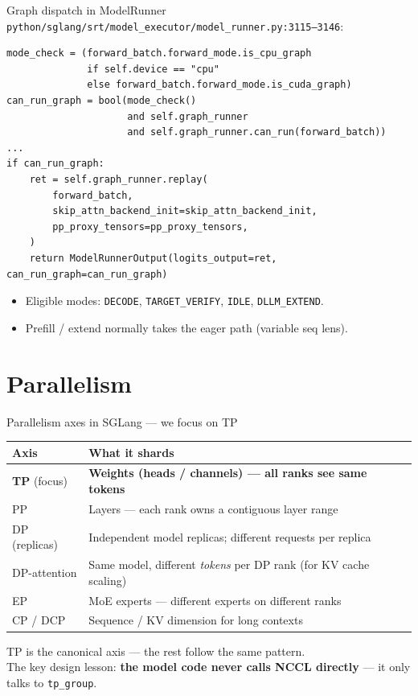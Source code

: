\documentclass[aspectratio=169,10pt]{beamer}
\begin{document}
\begin{frame}[fragile]{Graph dispatch in ModelRunner}
  \footnotesize
  \texttt{python/sglang/srt/model\_executor/model\_runner.py:3115--3146}:
\begin{lstlisting}
mode_check = (forward_batch.forward_mode.is_cpu_graph
              if self.device == "cpu"
              else forward_batch.forward_mode.is_cuda_graph)
can_run_graph = bool(mode_check()
                     and self.graph_runner
                     and self.graph_runner.can_run(forward_batch))
...
if can_run_graph:
    ret = self.graph_runner.replay(
        forward_batch,
        skip_attn_backend_init=skip_attn_backend_init,
        pp_proxy_tensors=pp_proxy_tensors,
    )
    return ModelRunnerOutput(logits_output=ret, can_run_graph=can_run_graph)
\end{lstlisting}
  \begin{itemize}\scriptsize
    \item Eligible modes: \texttt{DECODE}, \texttt{TARGET\_VERIFY}, \texttt{IDLE}, \texttt{DLLM\_EXTEND}.
    \item Prefill / extend normally takes the eager path (variable seq lens).
  \end{itemize}
\end{frame}

\section{Parallelism}

\begin{frame}{Parallelism axes in SGLang --- we focus on TP}
  \centering
  \small
  \begin{tabular}{l p{9cm}}
    \toprule
    \textbf{Axis} & \textbf{What it shards} \\
    \midrule
    \textbf{TP} \textcolor{slred}{(focus)} & \textbf{Weights (heads / channels) --- all ranks see same tokens} \\
    PP & Layers --- each rank owns a contiguous layer range \\
    DP (replicas) & Independent model replicas; different requests per replica \\
    DP-attention & Same model, different \emph{tokens} per DP rank (for KV cache scaling) \\
    EP & MoE experts --- different experts on different ranks \\
    CP / DCP & Sequence / KV dimension for long contexts \\
    \bottomrule
  \end{tabular}
  \vspace{0.4cm}
  \footnotesize
  TP is the canonical axis --- the rest follow the same pattern.\\
  The key design lesson: \textcolor{slred}{\textbf{the model code never calls NCCL directly}} --- it only talks to \texttt{tp\_group}.
\end{frame}
\end{document}
